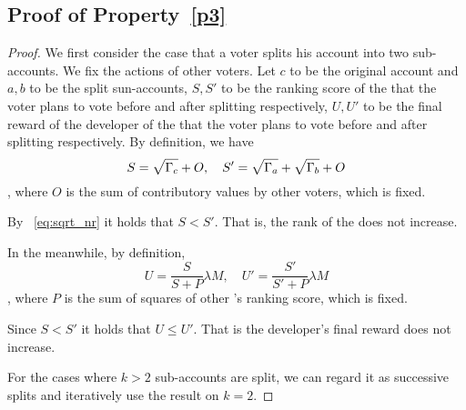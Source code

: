 \subsection{Proof of Property~\ref{p3}}
\begin{proof}
	We first consider the case that a voter splits his account into two sub-accounts. We fix the actions of other voters. Let $c$ to be the original account and $a,b$ to be the split sun-accounts, $S,S'$ to be the ranking score of the \dapp that the voter plans to vote before and after splitting respectively, $U,U'$ to be the final reward of the developer of the \dapp that the voter plans to vote before and after splitting respectively. By definition, we have
	$$S= \sqrt{\Gamma_c}+O,\quad S'=\sqrt{\Gamma_a}+\sqrt{\Gamma_b}+O$$,
	where $O$ is the sum of contributory values by other voters, which is fixed.

	By ~\ref{eq:sqrt_nr} it holds that $S < S'$. That is, the rank of the \dapp does not increase.

	In the meanwhile, by definition,
	$$U = \frac{S}{S+P}\lambda M,\quad U' = \frac{S'}{S'+P} \lambda M$$,
	where $P$ is the sum of squares of other \dapp's ranking score, which is fixed.

	Since $S < S'$ it holds that $U \leq U'$. That is the developer's final reward does not increase.

	For the cases where $k>2$ sub-accounts are split, we can regard it as successive splits and iteratively use the result on $k=2$.

\end{proof}